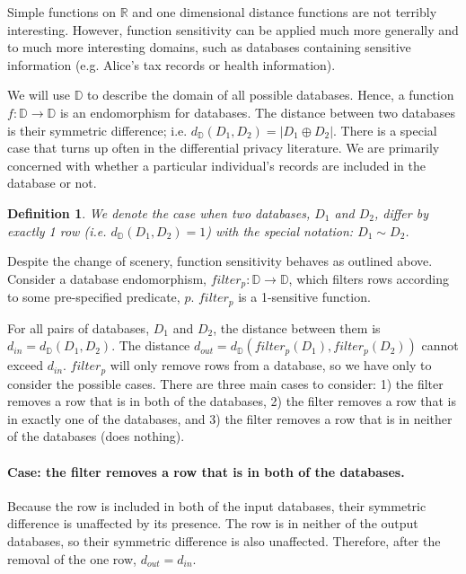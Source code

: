 \documentclass[12pt]{article}
\newtheorem{defn}{Definition}[section]
\begin{document}
Simple functions on $\mathbb R$ and one dimensional distance functions are not terribly interesting.
However, function sensitivity can be applied much more generally and to much more interesting domains, such as databases containing sensitive information (e.g. Alice's tax records or health information).

We will use $\mathbb D$ to describe the domain of all possible databases.
Hence, a function $f : \mathbb D \rightarrow \mathbb D$ is an endomorphism for databases.
The distance between two databases is their symmetric difference; i.e. $d_{\mathbb D}(D_1,D_2) = | D_1 \oplus D_2 |$.
There is a special case that turns up often in the differential privacy literature.
We are primarily concerned with whether a particular individual's records are included in the database or not.

\begin{defn}
  We denote the case when two databases, $D_1$ and $D_2$, differ by exactly 1 row (i.e. $d_{\mathbb D}(D_1,D_2)=1$) with the special notation: $D_1 \sim D_2$.
\end{defn}


Despite the change of scenery, function sensitivity behaves as outlined above.
Consider a database endomorphism, $filter_p : \mathbb D \rightarrow \mathbb D$, which filters rows according to some pre-specified predicate, $p$.
$filter_p$ is a 1-sensitive function.

For all pairs of databases, $D_1$ and $D_2$, the distance between them is $d_{in} = d_{\mathbb D}(D_1,D_2)$.
The distance $d_{out} = d_{\mathbb D}(filter_p(D_1),filter_p(D_2))$ cannot exceed $d_{in}$.
$filter_p$ will only remove rows from a database, so we have only to consider the possible cases.
There are three main cases to consider:
1) the filter removes a row that is in both of the databases,
2) the filter removes a row that is in exactly one of the databases, and
3) the filter removes a row that is in neither of the databases (does nothing).

\paragraph{Case: the filter removes a row that is in both of the databases.}
Because the row is included in both of the input databases, their symmetric difference is unaffected by its presence.
The row is in neither of the output databases, so their symmetric difference is also unaffected.
Therefore, after the removal of the one row, $d_{out} = d_{in}$.
\end{document}
